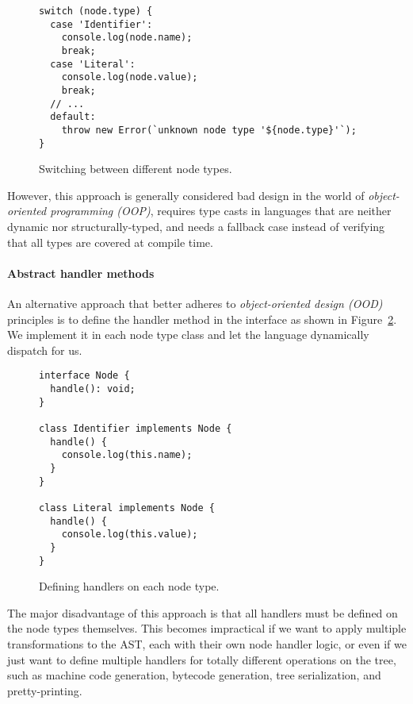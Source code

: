 \begin{figure}
  \begin{verbatim}
switch (node.type) {
  case 'Identifier':
    console.log(node.name);
    break;
  case 'Literal':
    console.log(node.value);
    break;
  // ...
  default:
    throw new Error(`unknown node type '${node.type}'`);
}
  \end{verbatim}
  \caption{
    Switching between different node types.
  }\label{fig:TreeNodeTypeSwitching}
\end{figure}

However, this approach is generally considered bad design
in the world of \textit{object-oriented programming (OOP)},
\autocite{VisitorPatternEssence}
requires type casts in languages that are
neither dynamic nor structurally-typed, and
needs a fallback case instead of
verifying that all types are covered at compile time.

\paragraph{Abstract handler methods}
An alternative approach that better adheres to
\textit{object-oriented design (OOD)} principles
is to define the handler method in the  interface
as shown in Figure~\ref{fig:TreeNodeAbstractHandlerMethods}.
\autocite{VisitorPatternEssence}
We implement it in each node type class
and let the language dynamically dispatch for us.

\begin{figure}
  \begin{verbatim}
interface Node {
  handle(): void;
}

class Identifier implements Node {
  handle() {
    console.log(this.name);
  }
}

class Literal implements Node {
  handle() {
    console.log(this.value);
  }
}
  \end{verbatim}
  \caption{
    Defining handlers on each node type.
  }\label{fig:TreeNodeAbstractHandlerMethods}
\end{figure}

The major disadvantage of this approach is that
all handlers must be defined on the node types themselves.
This becomes impractical if we want to
apply multiple transformations to the AST,
each with their own node handler logic,
or even if we just want to define multiple handlers
for totally different operations on the tree,
such as machine code generation, bytecode generation,
tree serialization, and pretty-printing.

